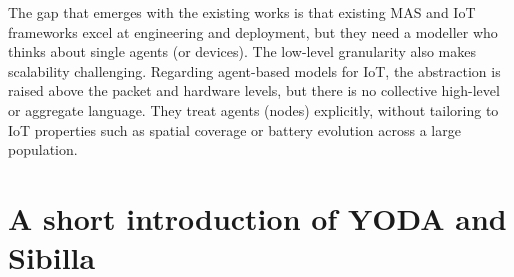 \documentclass[runningheads]{llncs}
\newcommand{\yoda}{\textsf{YODA}}
\newcommand{\sibilla}{\textsf{Sibilla}}
\begin{document}
The gap that emerges with the existing works is that existing MAS and IoT frameworks excel at engineering and deployment, but they need a modeller who thinks about single agents (or devices). The low-level granularity also makes scalability challenging. 
%
Regarding agent-based models for IoT, the abstraction is raised above the packet and hardware levels, but there is no collective high-level or aggregate language. They treat agents (nodes) explicitly, without tailoring to IoT properties such as spatial coverage or battery evolution across a large population.

\section{A short introduction of \yoda{} and \sibilla{}}\label{sec:background}
\end{document}
